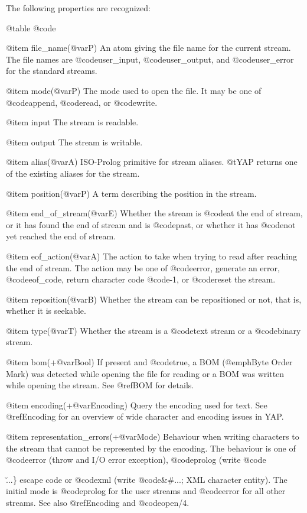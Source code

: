 {{{{{The following properties are recognized:

@table @code

@item file_name(@var{P})
An atom giving the file name for the current stream. The file names are
@code{user_input}, @code{user_output}, and @code{user_error} for the
standard streams.

@item mode(@var{P})
The mode used to open the file. It may be one of @code{append},
@code{read}, or @code{write}.

@item input
The stream is readable.

@item output
The stream is writable.

@item alias(@var{A})
ISO-Prolog primitive for stream aliases. @t{YAP} returns one of the
existing aliases for the stream.

@item position(@var{P})
A term describing the position in the stream.

@item end_of_stream(@var{E})
Whether the stream is @code{at} the end of stream, or it has found the
end of stream and is @code{past}, or whether it has @code{not} yet
reached the end of stream.

@item eof_action(@var{A})
The action to take when trying to read after reaching the end of
stream. The action may be one of @code{error}, generate an error,
@code{eof_code}, return character code @code{-1}, or @code{reset} the
stream.

@item reposition(@var{B})
Whether the stream can be repositioned or not, that is, whether it is
seekable.

@item type(@var{T})
Whether the stream is a @code{text} stream or a @code{binary} stream.

@item bom(+@var{Bool})
If present and @code{true}, a BOM (@emph{Byte Order Mark}) was
detected while opening the file for reading or a BOM was written while
opening the stream. See @ref{BOM} for details.

@item encoding(+@var{Encoding})
Query the encoding used for text.  See @ref{Encoding} for an
overview of wide character and encoding issues in YAP.

@item representation_errors(+@var{Mode})
Behaviour when writing characters to the stream that cannot be
represented by the encoding.  The behaviour is one of @code{error}
(throw and I/O error exception), @code{prolog} (write @code{\u...\}
escape code or @code{xml} (write @code{&#...;} XML character entity).
The initial mode is @code{prolog} for the user streams and
@code{error} for all other streams. See also @ref{Encoding} and
@code{open/4}.

}}}}}}
